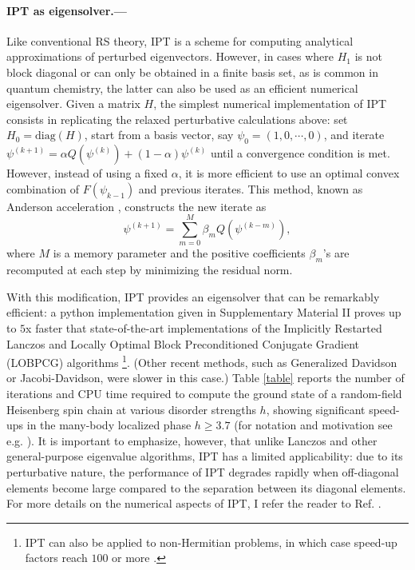 \documentclass[aps,prl,reprint]{revtex4-2}
\begin{document}
	\paragraph{IPT as eigensolver.---}

    Like conventional RS theory, IPT is a scheme for computing analytical approximations of perturbed eigenvectors. However, in cases where $H_1$ is not block diagonal or can only be obtained in a finite basis set, as is common in quantum chemistry, the latter can also be used as an efficient numerical eigensolver. Given a  matrix $H$, the simplest numerical implementation of IPT consists in replicating the relaxed perturbative calculations above: set $H_0=\textrm{diag}(H)$, start from a basis vector, say $\psi_0=(1,0,\cdots , 0)$, and iterate $\psi^{(k+1)} = \alpha Q(\psi^{(k)}) + (1-\alpha) \psi^{(k)}$ until a convergence condition is met. However, instead of using a fixed $\alpha$, it is more efficient to use an optimal convex combination of $F(\psi_{k-1})$ and previous iterates. This method, known as Anderson acceleration \cite{walker2011anderson}, constructs the new iterate as
	\begin{equation}
	\psi^{(k+1)}=\sum_{m=0}^M\beta_mQ(\psi^{(k-m)}),
	\end{equation}
where $M$ is a memory parameter and the positive coefficients $\beta_m$'s are recomputed at each step by minimizing the residual norm.

With this modification, IPT provides an eigensolver that can be remarkably efficient: a python implementation given in Supplementary Material II proves up to $5$x faster that state-of-the-art implementations of the Implicitly Restarted Lanczos and Locally Optimal Block Preconditioned Conjugate Gradient (LOBPCG) algorithms \footnote{IPT can also be applied to non-Hermitian problems, in which case speed-up factors reach $100$ or more \cite{kenmoeFastIterativeAlgorithm2021}.}. (Other recent methods, such as Generalized Davidson or Jacobi-Davidson, were slower in this case.) Table \ref{table} reports the number of iterations and CPU time required to compute the ground state of a random-field Heisenberg spin chain at various disorder strengths $h$, showing significant speed-ups in the many-body localized phase $h\geq 3.7$ (for notation and motivation see e.g. \cite{luitz2015many}). It is important to emphasize, however, that unlike Lanczos and other general-purpose eigenvalue algorithms, IPT has a limited applicability: due to its perturbative nature, the performance of IPT degrades rapidly when off-diagonal elements become large compared to the separation between its diagonal elements. For more details on the numerical aspects of IPT, I refer the reader to Ref.  \cite{kenmoeFastIterativeAlgorithm2021}.
\end{document}
